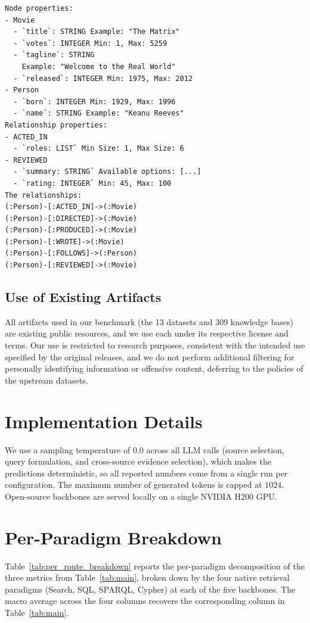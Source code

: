 \begin{tcolorbox}[colback=gray!5, colframe=gray!50, boxrule=0.5pt, arc=2mm, left=4pt, right=4pt, top=3pt, bottom=3pt]
{\footnotesize
\begin{verbatim}
Node properties:
- Movie
  - `title`: STRING Example: "The Matrix"
  - `votes`: INTEGER Min: 1, Max: 5259
  - `tagline`: STRING
    Example: "Welcome to the Real World"
  - `released`: INTEGER Min: 1975, Max: 2012
- Person
  - `born`: INTEGER Min: 1929, Max: 1996
  - `name`: STRING Example: "Keanu Reeves"
Relationship properties:
- ACTED_IN
  - `roles: LIST` Min Size: 1, Max Size: 6
- REVIEWED
  - `summary: STRING` Available options: [...]
  - `rating: INTEGER` Min: 45, Max: 100
The relationships:
(:Person)-[:ACTED_IN]->(:Movie)
(:Person)-[:DIRECTED]->(:Movie)
(:Person)-[:PRODUCED]->(:Movie)
(:Person)-[:WROTE]->(:Movie)
(:Person)-[:FOLLOWS]->(:Person)
(:Person)-[:REVIEWED]->(:Movie)
\end{verbatim}
}
\end{tcolorbox}

\subsection{Use of Existing Artifacts}
\label{sec:appendix_artifacts}
All artifacts used in our benchmark (the 13 datasets and 309 knowledge bases) are existing public resources, and we use each under its respective license and terms. Our use is restricted to research purposes, consistent with the intended use specified by the original releases, and we do not perform additional filtering for personally identifying information or offensive content, deferring to the policies of the upstream datasets.

\section{Implementation Details}
\label{sec:appendix_implementation}
We use a sampling temperature of $0.0$ across all LLM calls (source selection, query formulation, and cross-source evidence selection), which makes the predictions deterministic, so all reported numbers come from a single run per configuration. The maximum number of generated tokens is capped at $1024$. Open-source backbones are served locally on a single NVIDIA H200 GPU.

\section{Per-Paradigm Breakdown}
\label{sec:appendix_per_paradigm}
Table~\ref{tab:per_route_breakdown} reports the per-paradigm decomposition of the three metrics from Table~\ref{tab:main}, broken down by the four native retrieval paradigms (Search, SQL, SPARQL, Cypher) at each of the five backbones. The macro average across the four columns recovers the corresponding column in Table~\ref{tab:main}.

